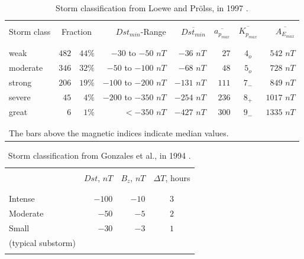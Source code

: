 \documentclass[sn-mathphys-num]{sn-jnl}%
\begin{document}
\begin{table}[!ht]
    \centering
    \caption{Storm classification from Loewe and Prölss, in 1997 \cite{loewe1997classification}.}
    \label{tab:loewe1997}
    \begin{tabular}{lrrrrrcr}
        \hline
        \\
        Storm class & \multicolumn{2}{c}{Fraction} & $Dst_{min}$-Range & $\overline{Dst_{min}}$ & $\overline{a_{p_{max}}}$ & $\overline{K_{p_{max}}}$ & $\overline{A_{E_{max}}}$ \\
        \\
        \hline
        \\
        weak & $482$ & $44\%$ & $-30$ to $-50$ $nT$ & $-36$ $nT$ & $27$ & $4_{o}$ & $542$ $nT$ \\
        moderate & $346$ & $32\%$ & $-50$ to $-100$ $nT$ & $-68$ $nT$ & $48$ & $5_{o}$ & $728$ $nT$ \\
        strong & $206$ & $19\%$ & $-100$ to $-200$ $nT$ & $-131$ $nT$ & $111$ & $7_{-}$ & $849$ $nT$ \\
        severe & $45$ & $4\%$ & $-200$ to $-350$ $nT$ & $-254$ $nT$ & $236$ & $8_{+}$ & $1017$ $nT$ \\
        great & $6$ & $1\%$ & $<-350$ $nT$ & $-427$ $nT$ & $300$ & $9_{-}$ & $1335$ $nT$ \\
        \\
        \hline
        \\
        \multicolumn{8}{l}{The bars above the magnetic indices indicate median values.} \\
    \end{tabular}
\end{table}

\begin{table}[!ht]
    \centering
    \caption{Storm classification from Gonzales et al., in 1994 \cite{gonzalez1994geomagnetic}.}
    \label{tab:gonzalez1994}
    \begin{tabular}{lrrc}
        \hline
        \\
         & $Dst$, $nT$ & $B_{z}$, $nT$ & $\Delta T$, hours \\
        \\
        \hline
        \\
        Intense & $-100$ & $-10$ & $3$ \\
        Moderate & $-50$ & $-5$ & $2$ \\
        Small & $-30$ & $-3$ & $1$ \\
        (typical substorm) & & & \\
        \\
        \hline
    \end{tabular}
\end{table}
\end{document}
